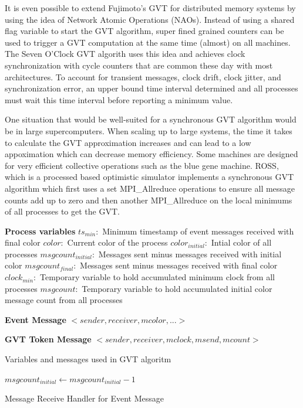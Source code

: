 \documentclass[11pt]{book}
\begin{document}
It is even possible to extend Fujimoto's GVT for distributed memory systems by using the idea of
Network Atomic Operations (NAOs)\cite{bauer-05}. Instead of using a shared flag variable to start
the GVT algorithm, super fined grained counters can be used to trigger a GVT computation at the
same time (almost) on all machines. The Seven O'Clock GVT algorith uses this idea and achieves clock
synchronization with cycle counters that are common these day with most architectures. To account
for transient messages, clock drift, clock jitter, and synchronization error, an upper bound time
interval determined and all processes must wait this time interval before reporting a minimum value.

One situation that would be well-suited for a synchronous GVT algorithm would be in large
supercomputers. When scaling up to large systems, the time it takes to calculate the GVT approximation
increases and can lead to a low appoximation which can decrease memory efficiency. Some machines
are designed for very efficient collective operations such as the blue gene machine.
ROSS, which is a processed based optimistic simulator implements a synchronous GVT algorithm which
first uses a set MPI\_Allreduce operations to ensure all message counts add up to zero and then
another MPI\_Allreduce on the local minimums of all processes to get the GVT.

\begin{algorithm}
\DontPrintSemicolon

\textbf{Process variables}\;
\boldmath$ts_{min}:$ Minimum timestamp of event messages received with final color\;
\boldmath$color:$ Current color of the process\;
\boldmath$color_{initial}:$ Intial color of all processes\;
\boldmath$msgcount_{initial}:$ Messages sent minus messages received with initial color\;
\boldmath$msgcount_{final}:$ Messages sent minus messages received with final color\;
\boldmath$clock_{min}:$ Temporary variable to hold accumulated minimum clock from all processes\;
\boldmath$msgcount:$ Temporary variable to hold accumulated initial color message count from all processes\;\;

\textbf{Event Message}\;
$<sender, receiver, mcolor,...>$\;\;

\textbf{GVT Token Message}\;
$<sender, receiver, mclock, msend, mcount>$\;

\caption{Variables and messages used in GVT algoritm}
\end{algorithm}

\begin{algorithm}
\DontPrintSemicolon
\SetAlgoVlined

   {
    $msgcount_{initial} \gets msgcount_{initial} - 1$\;
  }

\caption{Message Receive Handler for Event Message}
\end{algorithm}
\end{document}
